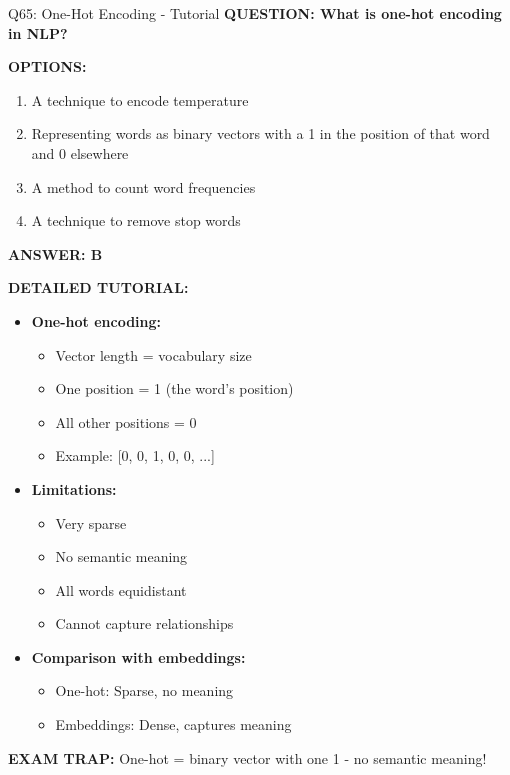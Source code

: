 \documentclass[8pt]{beamer}
\begin{document}
	\begin{frame}{Q65: One-Hot Encoding - Tutorial}
		\fontsize{6.5}{7.5}\selectfont
		\textbf{QUESTION: What is one-hot encoding in NLP?}
		
		\vspace{0.1cm}
		\textbf{OPTIONS:}
		\begin{enumerate}
			\item A technique to encode temperature
			\item Representing words as binary vectors with a 1 in the position of that word and 0 elsewhere
			\item A method to count word frequencies
			\item A technique to remove stop words
		\end{enumerate}
		
		\vspace{0.1cm}
		\textcolor{myblue}{\textbf{ANSWER: B}}
		
		\vspace{0.1cm}
		\textbf{DETAILED TUTORIAL:}
		\begin{itemize}
			\item \textbf{One-hot encoding:}
			\begin{itemize}
				\item Vector length = vocabulary size
				\item One position = 1 (the word's position)
				\item All other positions = 0
				\item Example: [0, 0, 1, 0, 0, ...]
			\end{itemize}
			\item \textbf{Limitations:}
			\begin{itemize}
				\item Very sparse
				\item No semantic meaning
				\item All words equidistant
				\item Cannot capture relationships
			\end{itemize}
			\item \textbf{Comparison with embeddings:}
			\begin{itemize}
				\item One-hot: Sparse, no meaning
				\item Embeddings: Dense, captures meaning
			\end{itemize}
		\end{itemize}
		
		\textcolor{myred}{\textbf{EXAM TRAP:}} One-hot = \textcolor{myblue}{binary vector with one 1} - no semantic meaning!
	\end{frame}
	
\end{document}
